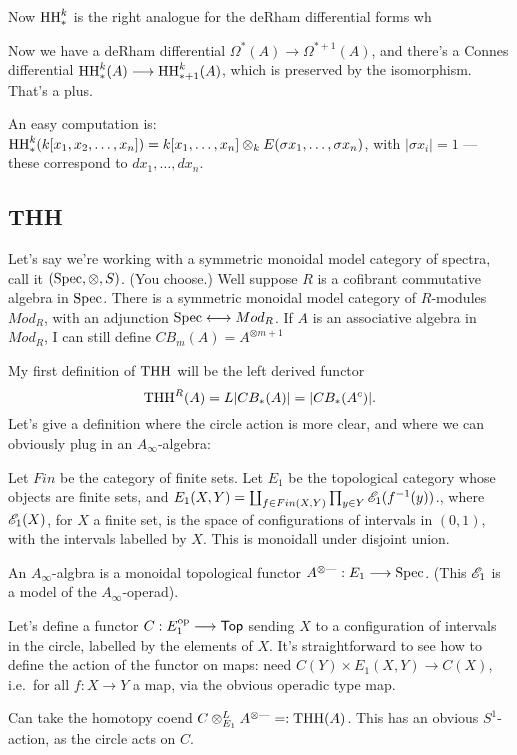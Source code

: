 \documentclass[11pt]{article}
\begin{document}
\begin{GeoffroyTopologicalHochschildHomology}
\begin{enumerate}
\begin{thm*}
Now $\textup{HH}_*^k$ is the right analogue for the deRham differential forms wh

Now we have a deRham differential $\Omega^*(A)\to\Omega^{*+1}(A)$, and there's a Connes differential $\textup{HH}_*^k(A)\longrightarrow \textup{HH}_{*+1}^k(A)$, which is preserved by the isomorphism. That's a plus.
\end{thm*}
An easy computation is:
$\textup{HH}_*^k(k[x_1,x_2,\ldots,x_n])=k[x_1,\ldots,x_n]\otimes_k E(\sigma x_1,\ldots,\sigma x_n)$, with $|\sigma x_i|=1$ --- these correspond to $d x_1,\ldots, d x_n$.
\end{enumerate}
\subsection*{THH}
Let's say we're working with a symmetric monoidal model category of spectra, call it $(\operatorname{Spec},\otimes,S)$. (You choose.) Well suppose $R$ is a cofibrant commutative algebra in $\operatorname{Spec}$. There is a symmetric monoidal model category of $R$-modules $Mod_R$, with an adjunction $\operatorname{Spec}\longleftrightarrow Mod_R$. 
If $A$ is an associative algebra in $Mod_R$, I can still define $CB_m(A)=A^{\otimes m+1}$

My first definition of $\textup{THH}$ will be the left derived functor
\[\textup{THH}^R(A)=L|CB_*(A)|=|CB_*(A^c)|.\]
Let's give a definition where the circle action is more clear, and where we can obviously plug in an $A_\infty$-algebra:
\begin{defn*} 
Let $Fin$ be the category of finite sets. Let $E_1$ be the topological category whose objects are finite sets, and $E_1(X,Y)=\coprod_{f\in Fin(X,Y)}\prod_{y\in Y} \mathscr{E}_1(f^{-1}(y))$., where $\mathscr{E}_1(X)$, for $X$ a finite set, is the space of configurations of intervals in $(0,1)$, with the intervals labelled by $X$.
 This is monoidall under disjoint union.

An $A_\infty$-algbra is a monoidal topological functor $A^{\otimes\textup{---}}:E_1\longrightarrow\operatorname{Spec}$. (This $\mathscr{E}_1$ is a model of the $A_\infty$-operad).

Let's define a functor $C:E_1^{\textup{op}}\longrightarrow\operatorname{{\mathsf{Top}}}$ sending $X$ to a configuration of intervals in the circle, labelled by the elements of $X$. It's straightforward to see how to define the action of the functor on maps: need $C(Y)\times E_1(X,Y)\to C(X)$, i.e.\ for all $f:X\to Y$ a map, via the obvious operadic type map.
\end{defn*}
Can take the homotopy coend $C\otimes_{E_1}^L A^{\otimes\textup{---}}=:\textup{THH}(A)$. This has an obvious $S^1$-action, as the circle acts on $C$.

\end{GeoffroyTopologicalHochschildHomology}
\end{document}
